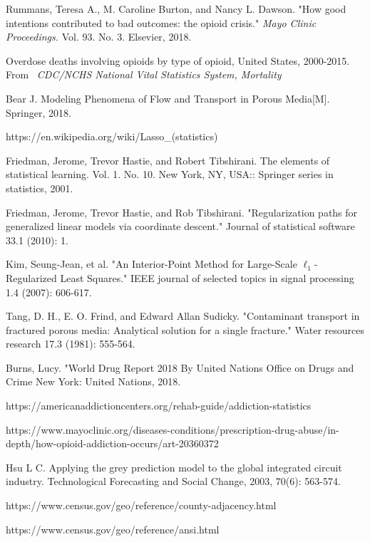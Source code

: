 \documentclass[12pt]{article} %
\begin{document}
\begin{thebibliography}{99} %

Rummans, Teresa A., M. Caroline Burton, and Nancy L. Dawson. "How good intentions contributed to bad outcomes: the opioid crisis." \textit{Mayo Clinic Proceedings.} Vol. 93. No. 3. Elsevier, 2018.

Overdose deaths involving opioids by type of opioid, United States, 2000-2015. From  \textit{CDC/NCHS National Vital Statistics System, Mortality}

Bear J. Modeling Phenomena of Flow and Transport in Porous Media[M]. Springer, 2018.

https://en.wikipedia.org/wiki/Lasso\_(statistics)

Friedman, Jerome, Trevor Hastie, and Robert Tibshirani. The elements of statistical learning. Vol. 1. No. 10. New York, NY, USA:: Springer series in statistics, 2001.

Friedman, Jerome, Trevor Hastie, and Rob Tibshirani. "Regularization paths for generalized linear models via coordinate descent." Journal of statistical software 33.1 (2010): 1.

Kim, Seung-Jean, et al. "An Interior-Point Method for Large-Scale $\ell_1 $-Regularized Least Squares." IEEE journal of selected topics in signal processing 1.4 (2007): 606-617.

Tang, D. H., E. O. Frind, and Edward Allan Sudicky. "Contaminant transport in fractured porous media: Analytical solution for a single fracture." Water resources research 17.3 (1981): 555-564.

Burns, Lucy. "World Drug Report 2018 By United Nations Office on Drugs and Crime New York: United Nations, 2018.

https://americanaddictioncenters.org/rehab-guide/addiction-statistics

https://www.mayoclinic.org/diseases-conditions/prescription-drug-abuse/in-depth/how-opioid-addiction-occurs/art-20360372

Hsu L C. Applying the grey prediction model to the global integrated circuit industry. Technological Forecasting and Social Change, 2003, 70(6): 563-574.

https://www.census.gov/geo/reference/county-adjacency.html

https://www.census.gov/geo/reference/ansi.html

\end{thebibliography}

\newpage
\begin{comment}
\appendix
\appendixpage
\section{Mathematical Backgrounds}
\newpage
\section{EXAMPLES(TO BE DELETED!)}

\end{comment}
\end{document}
